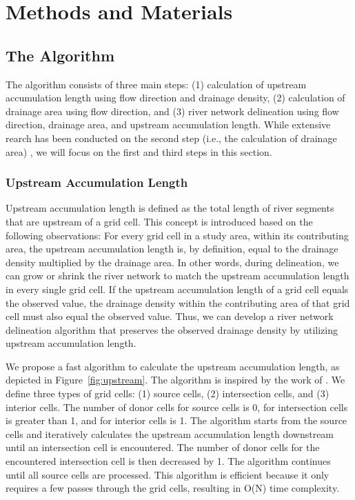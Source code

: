 \documentclass[water,article,submit,pdftex,moreauthors]{Definitions/mdpi}
\begin{document}
\section{Methods and Materials}
\label{sec:method}

\subsection{The Algorithm}
\label{sec:algorithm}

The algorithm consists of three main steps: (1) calculation of upstream accumulation length using flow direction and drainage density, (2) calculation of drainage area using flow direction, and (3) river network delineation using flow direction, drainage area, and upstream accumulation length. While extensive rearch has been conducted on the second step (i.e., the calculation of drainage area) \citep{zhou2019FES}, we will focus on the first and third steps in this section.

\subsubsection{Upstream Accumulation Length}
\label{sec:upstream}

Upstream accumulation length is defined as the total length of river segments that are upstream of a grid cell. This concept is introduced based on the following observations: For every grid cell in a study area, within its contributing area, the upstream accumulation length is, by definition, equal to the drainage density multiplied by the drainage area. In other words, during delineation, we can grow or shrink the river network to match the upstream accumulation length in every single grid cell. If the upstream accumulation length of a grid cell equals the observed value, the drainage density within the contributing area of that grid cell must also equal the observed value. Thus, we can develop a river network delineation algorithm that preserves the observed drainage density by utilizing upstream accumulation length.

We propose a fast algorithm to calculate the upstream accumulation length, as depicted in Figure~\ref{fig:upstream}. The algorithm is inspired by the work of \citet{zhou2019FES}. We define three types of grid cells: (1) source cells, (2) intersection cells, and (3) interior cells. The number of donor cells for source cells is 0, for intersection cells is greater than 1, and for interior cells is 1. The algorithm starts from the source cells and iteratively calculates the upstream accumulation length downstream until an intersection cell is encountered. The number of donor cells for the encountered intersection cell is then decreased by 1. The algorithm continues until all source cells are processed. This algorithm is efficient because it only requires a few passes through the grid cells, resulting in O(N) time complexity.
\end{document}
